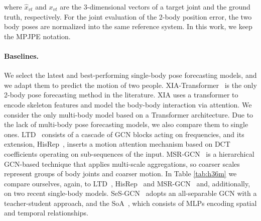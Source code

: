 \documentclass[10pt,twocolumn,letterpaper]{article}
\begin{document}
where $\hat{x}_{vt}$ and $x_{vt}$ are the 3-dimensional vectors of a target joint and the ground truth, respectively.
For the joint evaluation of the 2-body position error, the two body poses are normalized into the same reference system. In this work, we keep the MPJPE notation. 

\paragraph{Baselines.} 
 We select the latest and best-performing single-body pose forecasting models, and we adapt them to predict the motion of two people.
XIA-Transformer~\cite{guo21} is the only 2-body pose forecasting method in the literature. XIA uses a transformer to encode skeleton features and model the body-body interaction via attention. We consider \cite{wang21} the only multi-body model based on a Transformer architecture.
Due to the lack of multi-body pose forecasting models, we also compare them to single ones. 
LTD~\cite{mao19ltd} consists of a cascade of GCN blocks acting on frequencies, and its extension, HisRep~\cite{mao20his}, inserts a motion attention mechanism based on DCT coefficients operating on sub-sequences of the input. 
MSR-GCN~\cite{Dang21} is a hierarchical GCN-based technique that applies multi-scale aggregations, so coarser scales represent groups of body joints and coarser motion. 
In Table \ref{tab:h36m} we compare ourselves, again,  to LTD~\cite{mao19ltd}, HisRep~\cite{mao20his} and MSR-GCN~\cite{Dang21} and, additionally, on two recent single-body models.
SeS-GCN~\cite{sampieri22} adopts an all-separable GCN with a teacher-student approach, and the SoA~\cite{guo2022back}, which consists of MLPs encoding spatial and temporal relationships. 
\end{document}
